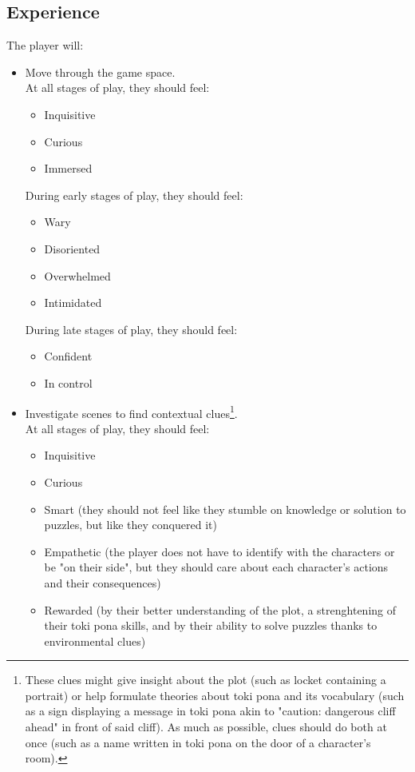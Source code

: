 \documentclass{scrartcl}
\begin{document}
		\subsection{Experience}
			The player will:
			\begin{itemize}
				\item Move through the game space. \\
				At all stages of play, they should feel:
				\begin{itemize}
					\item Inquisitive
					\item Curious
					\item Immersed
				\end{itemize}
				During early stages of play, they should feel: 
				\begin{itemize}
					\item Wary
					\item Disoriented
					\item Overwhelmed
					\item Intimidated
				\end{itemize}
				During late stages of play, they should feel:
				\begin{itemize}
					\item Confident
					\item In control
				\end{itemize}
				\item Investigate scenes to find contextual clues\footnote{These clues might give insight about the plot (such as locket containing a portrait) or help formulate theories about toki pona and its vocabulary (such as a sign displaying a message in toki pona akin to "caution: dangerous cliff ahead" in front of said cliff). As much as possible, clues should do both at once (such as a name written in toki pona on the door of a character's room).}.\\
				At all stages of play, they should feel:
				\begin{itemize}
					\item Inquisitive
					\item Curious
					\item Smart (they should not feel like they stumble on knowledge or solution to puzzles, but like they conquered it)
					\item Empathetic (the player does not have to identify with the characters or be "on their side", but they should care about each character's actions and their consequences)
					\item Rewarded (by their better understanding of the plot, a strenghtening of their toki pona skills, and by their ability to solve puzzles thanks to environmental clues)

\end{itemize}
\end{itemize}
\end{document}
